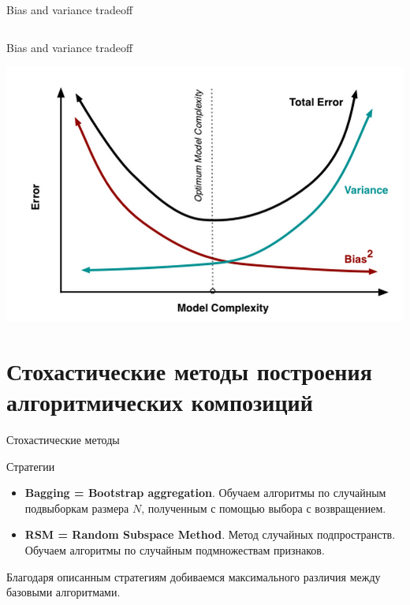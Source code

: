 \documentclass[10pt]{beamer}
\begin{document}
\begin{frame}{Bias and variance tradeoff}
\begin{columns}[C]
\begin{column}{.45\textwidth}
    \end{column}
\end{columns}
\end{frame}

\begin{frame}{Bias and variance tradeoff}
    \begin{center}
        \includegraphics[scale=0.3]{images/learningcurves.png}
    \end{center}
\end{frame}

\section{Стохастические методы построения алгоритмических композиций}

\begin{frame}{Стохастические методы}
\begin{block}{Стратегии}
\end{block}
\begin{itemize}
    \item \textbf{Bagging = Bootstrap aggregation}. Обучаем алгоритмы по
        случайным подвыборкам размера $N$, полученным с помощью выбора с
        возвращением.
    \item \textbf{RSM = Random Subspace Method}. Метод случайных
        подпространств. Обучаем алгоритмы по случайным подмножествам признаков.
\end{itemize}

\vspace{1em}
Благодаря описанным стратегиям добиваемся максимального различия между базовыми
алгоритмами.
\end{frame}
\end{document}
